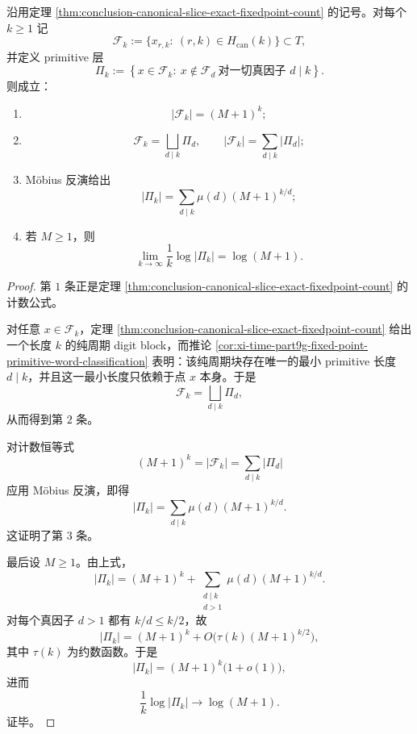 \begin{theorem}\label{thm:conclusion-canonical-fixedpoint-primitive-mobius}
沿用定理 \ref{thm:conclusion-canonical-slice-exact-fixedpoint-count} 的记号。对每个 \(k\ge 1\) 记
\[
\mathcal F_k:=\{x_{r,k}:\ (r,k)\in H_{\mathrm{can}}(k)\}\subset T,
\]
并定义 primitive 层
\[
\Pi_k:=
\left\{
x\in \mathcal F_k:\ 
x\notin \mathcal F_d\ \text{对一切真因子 }d\mid k
\right\}.
\]
则成立：
\begin{enumerate}
  \item
  \[
  |\mathcal F_k|=(M+1)^k;
  \]
  \item
  \[
  \mathcal F_k=\bigsqcup_{d\mid k}\Pi_d,
  \qquad
  |\mathcal F_k|=\sum_{d\mid k}|\Pi_d|;
  \]
  \item Möbius 反演给出
  \[
  |\Pi_k|=\sum_{d\mid k}\mu(d)(M+1)^{k/d};
  \]
  \item 若 \(M\ge 1\)，则
  \[
  \lim_{k\to\infty}\frac{1}{k}\log |\Pi_k|=\log(M+1).
  \]
\end{enumerate}
\end{theorem}
\begin{proof}
第 \(1\) 条正是定理 \ref{thm:conclusion-canonical-slice-exact-fixedpoint-count} 的计数公式。

对任意 \(x\in \mathcal F_k\)，定理 \ref{thm:conclusion-canonical-slice-exact-fixedpoint-count} 给出一个长度 \(k\) 的纯周期 digit block，而推论 \ref{cor:xi-time-part9g-fixed-point-primitive-word-classification} 表明：该纯周期块存在唯一的最小 primitive 长度 \(d\mid k\)，并且这一最小长度只依赖于点 \(x\) 本身。于是
\[
\mathcal F_k=\bigsqcup_{d\mid k}\Pi_d,
\]
从而得到第 \(2\) 条。

对计数恒等式
\[
(M+1)^k=|\mathcal F_k|=\sum_{d\mid k}|\Pi_d|
\]
应用 Möbius 反演，即得
\[
|\Pi_k|=\sum_{d\mid k}\mu(d)(M+1)^{k/d}.
\]
这证明了第 \(3\) 条。

最后设 \(M\ge 1\)。由上式，
\[
|\Pi_k|
=(M+1)^k+\sum_{\substack{d\mid k\\ d>1}}\mu(d)(M+1)^{k/d}.
\]
对每个真因子 \(d>1\) 都有 \(k/d\le k/2\)，故
\[
|\Pi_k|
=(M+1)^k+O\!\bigl(\tau(k)(M+1)^{k/2}\bigr),
\]
其中 \(\tau(k)\) 为约数函数。于是
\[
|\Pi_k|=(M+1)^k\bigl(1+o(1)\bigr),
\]
进而
\[
\frac{1}{k}\log|\Pi_k|\longrightarrow \log(M+1).
\]
证毕。
\end{proof}

